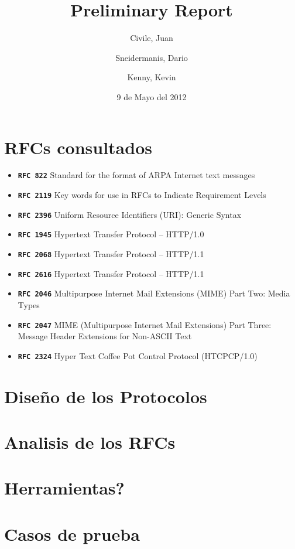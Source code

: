 \documentclass[11pt,a4paper,titlepage]{article}
\title{Preliminary Report}
\author{Civile, Juan \and Sneidermanis, Dario \and Kenny, Kevin}
\date{9 de Mayo del 2012}
\begin{document}
\newcommand{\awesome}[1]{\texttt{\textbf{#1}}}
\maketitle
\tableofcontents
\clearpage

\section{RFCs consultados}

\begin{itemize}

    \item \awesome{RFC 822}  Standard for the format of ARPA Internet text messages
    \item \awesome{RFC 2119} Key words for use in RFCs to Indicate Requirement Levels
    \item \awesome{RFC 2396} Uniform Resource Identifiers (URI): Generic Syntax
    \item \awesome{RFC 1945} Hypertext Transfer Protocol -- HTTP/1.0
    \item \awesome{RFC 2068} Hypertext Transfer Protocol -- HTTP/1.1
    \item \awesome{RFC 2616} Hypertext Transfer Protocol -- HTTP/1.1
    \item \awesome{RFC 2046} Multipurpose Internet Mail Extensions (MIME) Part Two: Media Types
    \item \awesome{RFC 2047} MIME (Multipurpose Internet Mail Extensions) Part Three: Message Header Extensions for Non-ASCII Text
    \item \awesome{RFC 2324} Hyper Text Coffee Pot Control Protocol (HTCPCP/1.0)

\end{itemize}

\section{Diseño de los Protocolos}

\section{Analisis de los RFCs}

\section{Herramientas?}

\section{Casos de prueba}
\end{document}

